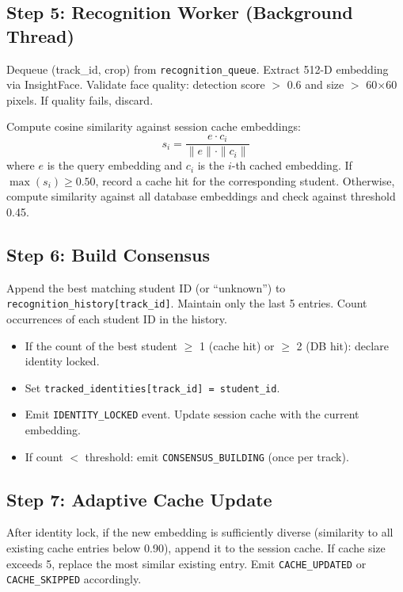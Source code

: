 \documentclass{report}
\begin{document}
\subsection*{Step 5: Recognition Worker (Background Thread)}
Dequeue (track\_id, crop) from \texttt{recognition\_queue}. Extract 512-D embedding via InsightFace.\vspace{3pt} Validate face quality: detection score $>$ 0.6 and size $>$ 60$\times$60 pixels. If quality fails, discard.

Compute cosine similarity against session cache embeddings:
\begin{equation}
    s_i = \frac{e \cdot c_i}{\|e\| \cdot \|c_i\|}
\end{equation}
where $e$ is the query embedding and $c_i$ is the $i$-th cached embedding. If $\max(s_i) \geq 0.50$, record a cache hit for the corresponding student. Otherwise, compute similarity against all database embeddings and check against threshold 0.45.

\subsection*{Step 6: Build Consensus}
Append the best matching student ID (or ``unknown'') to \texttt{recognition\_history[track\_id]}.\vspace{3pt} Maintain only the last 5 entries. Count occurrences of each student ID in the history.

\begin{itemize}
    \item If the count of the best student $\geq$ 1 (cache hit) or $\geq$ 2 (DB hit): declare identity locked.
    \item Set \texttt{tracked\_identities[track\_id] = student\_id}.
    \item Emit \texttt{IDENTITY\_LOCKED} event. Update session cache with the current embedding.
    \item If count $<$ threshold: emit \texttt{CONSENSUS\_BUILDING} (once per track).
\end{itemize}

\subsection*{Step 7: Adaptive Cache Update}
After identity lock, if the new embedding is sufficiently diverse (similarity to all existing cache\vspace{3pt} entries below 0.90), append it to the session cache. If cache size exceeds 5, replace the most\vspace{3pt} similar existing entry. Emit \texttt{CACHE\_UPDATED} or \texttt{CACHE\_SKIPPED} accordingly.
\end{document}
